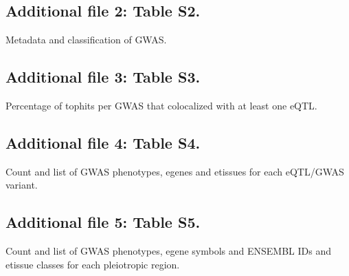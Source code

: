 \documentclass{bmcart}
\begin{document}
\begin{backmatter}
        \subsection*{Additional file 2: Table S2.}
        Metadata and classification of GWAS.

        \subsection*{Additional file 3: Table S3.}
        Percentage of tophits per GWAS that colocalized with at least one eQTL.

        \subsection*{Additional file 4: Table S4.}
        Count and list of GWAS phenotypes, egenes and etissues for each eQTL/GWAS variant.

        \subsection*{Additional file 5: Table S5.}
        Count and list of GWAS phenotypes, egene symbols and ENSEMBL IDs and etissue classes for each pleiotropic region.

    \end{backmatter}
\end{document}
